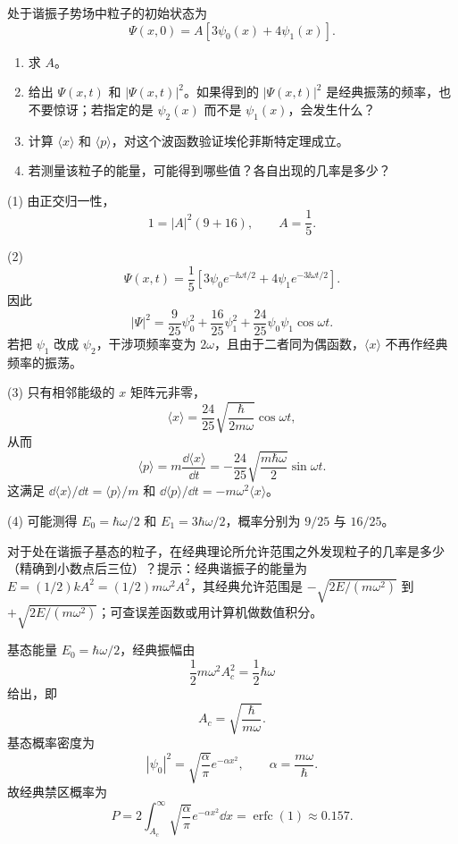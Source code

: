 \begin{question}
处于谐振子势场中粒子的初始状态为
\[
\Psi(x,0)=A[3\psi_0(x)+4\psi_1(x)].
\]
\begin{enumerate}
\item 求 $A$。
\item 给出 $\Psi(x,t)$ 和 $|\Psi(x,t)|^2$。如果得到的 $|\Psi(x,t)|^2$ 是经典振荡的频率，也不要惊讶；若指定的是 $\psi_2(x)$ 而不是 $\psi_1(x)$，会发生什么？
\item 计算 $\langle x\rangle$ 和 $\langle p\rangle$，对这个波函数验证埃伦菲斯特定理成立。
\item 若测量该粒子的能量，可能得到哪些值？各自出现的几率是多少？
\end{enumerate}
\end{question}
\begin{solution}
(1) 由正交归一性，
\[
1=|A|^2(9+16),
\qquad A=\frac15.
\]

(2) 
\[
\Psi(x,t)=\frac15\left[3\psi_0e^{-\ii\omega t/2}+4\psi_1e^{-3\ii\omega t/2}\right].
\]
因此
\[
|\Psi|^2=\frac{9}{25}\psi_0^2+\frac{16}{25}\psi_1^2+\frac{24}{25}\psi_0\psi_1\cos\omega t.
\]
若把 $\psi_1$ 改成 $\psi_2$，干涉项频率变为 $2\omega$，且由于二者同为偶函数，$\langle x\rangle$ 不再作经典频率的振荡。

(3) 只有相邻能级的 $x$ 矩阵元非零，
\[
\langle x\rangle=\frac{24}{25}\sqrt{\frac{\hbar}{2m\omega}}\cos\omega t,
\]
从而
\[
\langle p\rangle=m\frac{\dd\langle x\rangle}{\dd t}
=-\frac{24}{25}\sqrt{\frac{m\hbar\omega}{2}}\sin\omega t.
\]
这满足 $\dd\langle x\rangle/\dd t=\langle p\rangle/m$ 和 $\dd\langle p\rangle/\dd t=-m\omega^2\langle x\rangle$。

(4) 可能测得 $E_0=\hbar\omega/2$ 和 $E_1=3\hbar\omega/2$，概率分别为 $9/25$ 与 $16/25$。
\end{solution}

\begin{question}
对于处在谐振子基态的粒子，在经典理论所允许范围之外发现粒子的几率是多少（精确到小数点后三位）？提示：经典谐振子的能量为 $E=(1/2)kA^2=(1/2)m\omega^2A^2$，其经典允许范围是 $-\sqrt{2E/(m\omega^2)}$ 到 $+\sqrt{2E/(m\omega^2)}$；可查误差函数或用计算机做数值积分。
\end{question}
\begin{solution}
基态能量 $E_0=\hbar\omega/2$，经典振幅由
\[
\frac12m\omega^2A_c^2=\frac12\hbar\omega
\]
给出，即
\[
A_c=\sqrt{\frac{\hbar}{m\omega}}.
\]
基态概率密度为
\[
|\psi_0|^2=\sqrt{\frac{\alpha}{\pi}}e^{-\alpha x^2},
\qquad \alpha=\frac{m\omega}{\hbar}.
\]
故经典禁区概率为
\[
P=2\int_{A_c}^{\infty}\sqrt{\frac{\alpha}{\pi}}e^{-\alpha x^2}\dd x
=\operatorname{erfc}(1)
\approx 0.157.
\]
\end{solution}

